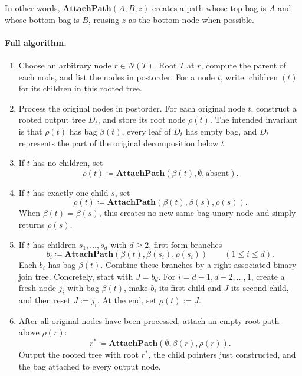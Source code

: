 \documentclass[11pt]{article}
\theoremstyle{definition}
\newcommand{\defeq}{\coloneqq}
\newcommand{\Nodes}{N}
\newcommand{\children}{\operatorname{children}}
\begin{document}
In other words, \(\textbf{AttachPath}(A,B,z)\) creates a path whose top bag is
\(A\) and whose bottom bag is \(B\), reusing \(z\) as the bottom node when
possible.

\paragraph{Full algorithm.}
\begin{enumerate}[label=\textbf{Step \arabic*.},leftmargin=*]
  \item Choose an arbitrary node \(r\in\Nodes(T)\).  Root \(T\) at \(r\), compute
    the parent of each node, and list the nodes in postorder.  For a node \(t\),
    write \(\children(t)\) for its children in this rooted tree.

  \item Process the original nodes in postorder.  For each original node \(t\),
    construct a rooted output tree \(D_t\), and store its root node
    \(\rho(t)\).  The intended invariant is that \(\rho(t)\) has bag
    \(\beta(t)\), every leaf of \(D_t\) has empty bag, and \(D_t\) represents
    the part of the original decomposition below \(t\).

  \item If \(t\) has no children, set
    \[
      \rho(t) \defeq \textbf{AttachPath}(\beta(t),\emptyset,\text{absent}).
    \]

  \item If \(t\) has exactly one child \(s\), set
    \[
      \rho(t) \defeq \textbf{AttachPath}(\beta(t),\beta(s),\rho(s)).
    \]
    When \(\beta(t)=\beta(s)\), this creates no new same-bag unary node and
    simply returns \(\rho(s)\).

  \item If \(t\) has children \(s_1,\ldots,s_d\) with \(d\ge 2\), first form
    branches
    \[
      b_i \defeq \textbf{AttachPath}(\beta(t),\beta(s_i),\rho(s_i))
      \qquad (1\le i\le d).
    \]
    Each \(b_i\) has bag \(\beta(t)\).  Combine these branches by a
    right-associated binary join tree.  Concretely, start with \(J=b_d\).  For
    \(i=d-1,d-2,\ldots,1\), create a fresh node \(j_i\) with bag \(\beta(t)\),
    make \(b_i\) its first child and \(J\) its second child, and then reset
    \(J:=j_i\).  At the end, set \(\rho(t):=J\).

  \item After all original nodes have been processed, attach an empty-root path
    above \(\rho(r)\):
    \[
      r^\ast \defeq \textbf{AttachPath}(\emptyset,\beta(r),\rho(r)).
    \]
    Output the rooted tree with root \(r^\ast\), the child pointers just
    constructed, and the bag attached to every output node.
\end{enumerate}
\end{document}
